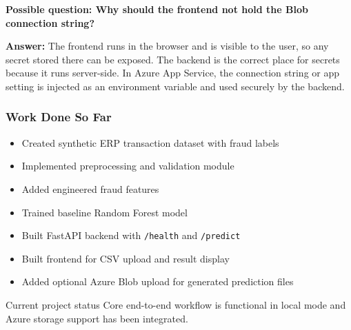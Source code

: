 \documentclass{beamer}
\begin{document}
\begin{frame}
{\textbf{Possible question: Why should the frontend not hold the Blob connection string?}

\textbf{Answer:} The frontend runs in the browser and is visible to the user, so any secret stored there can be exposed. The backend is the correct place for secrets because it runs server-side. In Azure App Service, the connection string or app setting is injected as an environment variable and used securely by the backend.
}
\end{frame}

\begin{frame}
\frametitle{Work Done So Far}
\begin{itemize}
    \item Created synthetic ERP transaction dataset with fraud labels
    \item Implemented preprocessing and validation module
    \item Added engineered fraud features
    \item Trained baseline Random Forest model
    \item Built FastAPI backend with \texttt{/health} and \texttt{/predict}
    \item Built frontend for CSV upload and result display
    \item Added optional Azure Blob upload for generated prediction files
\end{itemize}

\vspace{0.2cm}
\begin{block}{Current project status}
Core end-to-end workflow is functional in local mode and Azure storage support has been integrated.
\end{block}
\end{frame}
\end{document}
